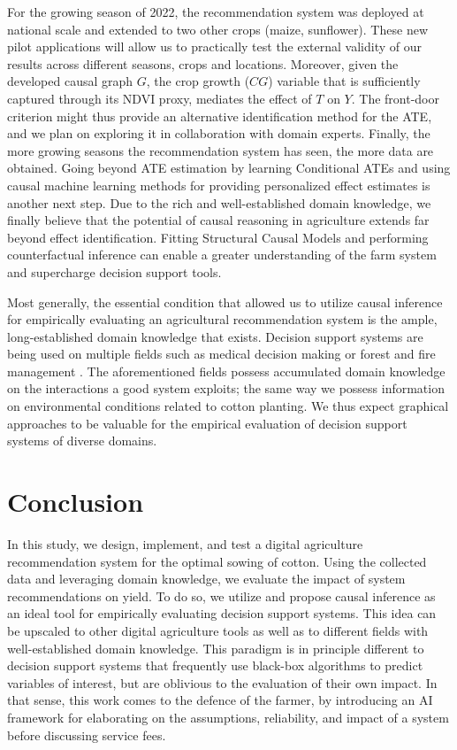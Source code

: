 \documentclass[letterpaper]{article} %
\begin{document}
For the growing season of 2022, the recommendation system was deployed at national scale and extended to two other crops (maize, sunflower).
These new pilot applications will allow us to practically test the external validity of our results across different seasons, crops and locations. Moreover, given the developed causal graph $G$, the crop growth ($CG$) variable that is sufficiently captured through its NDVI proxy, mediates the effect of $T$ on $Y$. The front-door criterion \cite{pearl2009causality} might thus provide an alternative identification method for the ATE, and we plan on exploring it in collaboration with domain experts. Finally, the more growing seasons the recommendation system has seen, the more data are obtained. Going beyond ATE estimation by learning Conditional ATEs and using causal machine learning methods for providing personalized effect estimates is another next step. Due to the rich and well-established domain knowledge, we finally believe that the potential of causal reasoning in agriculture extends far beyond effect identification. Fitting Structural Causal Models and performing counterfactual inference can enable a greater understanding of the farm system and supercharge decision support tools.

Most generally, the essential condition that allowed us to utilize causal inference for empirically evaluating an agricultural recommendation system is the ample, long-established domain knowledge that exists. Decision support systems are being used on multiple fields \cite{marakas2003decision} such as medical decision making \cite{sutton2020overview} or forest and fire management \cite{segura2014decision, martell2015review}. The aforementioned fields possess accumulated domain knowledge on the interactions a good system exploits; the same way we possess information on environmental conditions related to cotton planting. We thus expect graphical approaches to be valuable for the empirical evaluation of decision support systems of diverse domains.

\vspace{-0.85mm}
\vspace{-2.17mm}
\section{Conclusion}

In this study, we design, implement, and test a digital agriculture recommendation system for the optimal sowing of cotton. Using the collected data and leveraging domain knowledge, we evaluate the impact of system recommendations on yield. To do so, we utilize and propose causal inference as an ideal tool for empirically evaluating decision support systems.
This idea can be upscaled to other digital agriculture tools as well as to different fields with well-established domain knowledge. This paradigm is in principle different to decision support systems that frequently use black-box algorithms to predict variables of interest, but are oblivious to the evaluation of their own impact. In that sense, this work comes to the defence of the farmer, by introducing an AI framework for elaborating on the assumptions, reliability, and impact of a system before discussing service fees.
\end{document}
